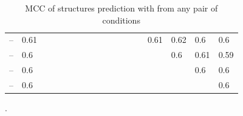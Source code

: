 \documentclass[11pt]{article} %
\begin{document}
\begin{table}[H]
\begin{adjustbox}{max width=\textwidth,max totalheight=\textheight,keepaspectratio}
\begin{tabular}{lHHHHHHHHHHHHHHHHH}
	 -- \NMIACE           & 0.61                     &        &        &        &        &        &        &        &        &        &         &         &         & 0.61    & 0.62    & 0.6     & 0.6     \\
	 -- \OneMSevCE        & 0.6                      &        &        &        &        &        &        &        &        &        &         &         &         &         & 0.6     & 0.61    & 0.59    \\
	 -- \BzCN             & 0.6                      &        &        &        &        &        &        &        &        &        &         &         &         &         &         & 0.6     & 0.6     \\
	 -- \NAICE            & 0.6                      &        &        &        &        &        &        &        &        &        &         &         &         &         &         &         & 0.6     \\ \bottomrule
\end{tabular}
\end{adjustbox}
\caption{MCC of structures prediction with \OurTool{} from any pair of conditions}.
\end{table}


%
\end{document}
